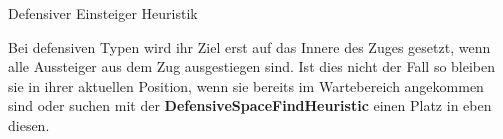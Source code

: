 \begin{algorithm} [H]
	\caption{Defensiver Einsteiger Heuristik}
	
\end{algorithm}

Bei defensiven Typen wird ihr Ziel erst auf das Innere des Zuges gesetzt, wenn alle Aussteiger aus dem Zug ausgestiegen sind. Ist dies nicht der Fall so bleiben sie in ihrer aktuellen Position, wenn sie bereits im Wartebereich angekommen sind oder suchen mit der \textbf{DefensiveSpaceFindHeuristic} einen Platz in eben diesen.

